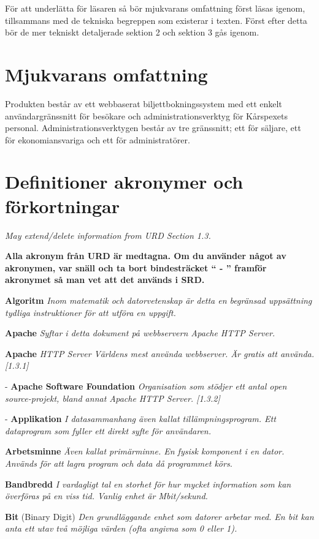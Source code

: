 \documentclass[a4paper, twoside, 11pt, titlepage]{article}
\begin{document}
För att underlätta för  läsaren så bör mjukvarans omfattning först läsas igenom, tillsammans med de tekniska begreppen som existerar i texten. Först efter detta bör de mer tekniskt detaljerade sektion 2 och sektion 3 gås igenom.

\clearpage
\section{Mjukvarans omfattning}


Produkten består av ett webbaserat biljettbokningssystem med ett enkelt användargränssnitt för besökare och administrationsverktyg för Kårspexets personal. Administrationsverktygen består av tre gränssnitt; ett för säljare, ett för ekonomiansvariga och ett för administratörer.

\clearpage
\section{Definitioner akronymer och förkortningar}


\emph{May extend/delete information from URD Section 1.3.}

\textbf{Alla akronym från URD är medtagna. Om du använder något av akronymen, var snäll och ta bort bindesträcket `` - '' framför akronymet så man vet att det används i SRD.}

\textbf{Algoritm} \emph{Inom matematik och datorvetenskap är detta en begränsad uppsättning tydliga instruktioner för att utföra en uppgift.}

\textbf{Apache} \emph{Syftar i detta dokument på webbservern Apache HTTP Server.}

\textbf{Apache} \emph{HTTP Server Världens mest använda webbserver. Är gratis att använda. [1.3.1]}

- \textbf{Apache Software Foundation} \emph{Organisation som stödjer ett antal open source-projekt, bland annat Apache HTTP Server. [1.3.2]}

- \textbf{Applikation} \emph{I datasammanhang även kallat tillämpningsprogram. Ett dataprogram som fyller ett direkt syfte för användaren.}

\textbf{Arbetsminne} \emph{Även kallat primärminne. En fysisk komponent i en dator. Används för att lagra program och data då programmet körs.}

\textbf{Bandbredd} \emph{I vardagligt tal en storhet för hur mycket information som kan överföras på en viss tid. Vanlig enhet är Mbit/sekund.}

\textbf{Bit} (Binary Digit) \emph{Den grundläggande enhet som datorer arbetar med. En bit kan anta ett utav två möjliga värden (ofta angivna som 0 eller 1).}
\end{document}
